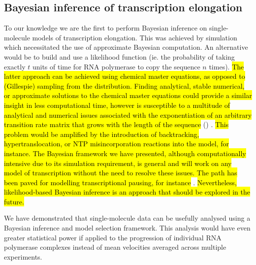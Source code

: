 \documentclass[10pt,letterpaper]{article}
\begin{document}
\subsection*{Bayesian inference of transcription elongation} To our knowledge we are the first to perform Bayesian inference on single-molecule models of transcription elongation. This was achieved by simulation which necessitated the use of approximate Bayesian computation. An alternative would be to build and use a likelihood function (ie. the probability of taking exactly $t$ units of time for RNA polymerase to copy the sequence $n$ times). \hl{The latter approach can be achieved using chemical master equations, as opposed to (Gillespie) sampling from the distribution. Finding analytical, stable numerical, or approximate solutions to the chemical master equations could provide a similar insight in less computational time, however is susceptible to a multitude of analytical and numerical issues associated with the exponentiation of an arbitrary transition rate matrix that grows with the length of the sequence} () \cite{moler2003nineteen}. \hl{This problem would be amplified by the introduction of backtracking, hypertranslocation, or NTP misincorporation reactions into the model, for instance. The Bayesian framework we have presented, although computationally intensive due to its simulation requirement, is general and will work on any model of transcription without the need to resolve these issues. The path has been paved for modelling transcriptional pausing, for instance} \cite{bai2004sequence,tadigotla2006thermodynamic,bai2010comparison}. \hl{Nevertheless, likelihood-based Bayesian inference is an approach that should be explored in the future. }



We have demonstrated that single-molecule data can be usefully analysed using a Bayesian inference and model selection framework. This analysis would have even greater statistical power if applied to the progression of individual RNA polymerase complexes instead of mean velocities averaged across multiple experiments.  \\
\end{document}
